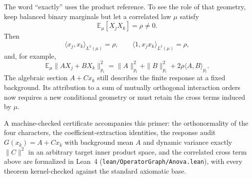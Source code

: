 The word ``exactly'' uses the product reference.  To see the role of that geometry, keep balanced
binary marginals but let a correlated law $\mu$ satisfy
\begin{equation}
\mathbb E_\mu[X_jX_k]=\rho\ne0.
\end{equation}
Then
\begin{equation}
\langle x_j,x_k\rangle_{L^2(\mu)}=\rho,
\qquad
\langle 1,x_jx_k\rangle_{L^2(\mu)}=\rho,
\label{eq:book-three-variable-correlated-inner-products}
\end{equation}
and, for example,
\begin{equation}
\mathbb E_\mu\|A X_j+B X_k\|_{p_i}^2
=\|A\|_{p_i}^2+\|B\|_{p_i}^2
+2\rho\langle A,B\rangle_{p_i}.
\label{eq:book-three-variable-correlated-cross-term}
\end{equation}
The algebraic section $A+C x_k$ still describes the finite response at a fixed background.
Its attribution to a sum of mutually orthogonal interaction orders now requires a new conditional
geometry or must retain the cross terms induced by $\mu$.

A machine-checked certificate accompanies this primer: the orthonormality of the four characters,
the coefficient-extraction identities, the response audit $G(x_k)=A+C x_k$ with background mean
$A$ and dynamic variance exactly $\|C\|^2$ in an arbitrary target inner product space, and the
correlated cross term above are formalized in Lean~4 (\texttt{lean/OperatorGraph/Anova.lean}),
with every theorem kernel-checked against the standard axiomatic base.
